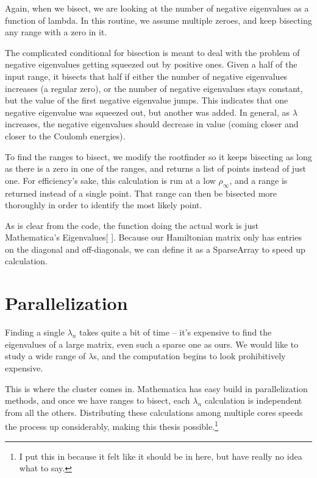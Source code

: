 \documentclass[12pt,twoside]{reedthesis}
\begin{document}
{Again, when we bisect, we are looking at the number of negative eigenvalues as a function of lambda. In this routine, we assume multiple zeroes, and keep bisecting any range with a zero in it.

The complicated conditional for bisection is meant to deal with the problem of negative eigenvalues getting squeezed out by positive ones. Given a half of the input range, it bisects that half if either the number of negative eigenvalues increases (a regular zero), or the number of negative eigenvalues stays constant, but the value of the first negative eigenvalue jumps. This indicates that one negative eigenvalue was squeezed out, but another was added. In general, as $\lambda$ increases, the negative eigenvalues should decrease in value (coming closer and closer to the Coulomb energies). 

To find the ranges to bisect, we modify the rootfinder so it keeps bisecting as long as there is a zero in one of the ranges, and returns a list of points instead of just one. For efficiency's sake, this calculation is run at a low $\rho_{\infty}$, and a range is returned instead of a single point. That range can then be bisected more thoroughly in order to identify the most likely point. 

As is clear from the code, the function doing the actual work is just Mathematica's Eigenvalues[ ]. Because our Hamiltonian matrix only has entries on the diagonal and off-diagonals, we can define it as a SparseArray to speed up calculation. 

\section{Parallelization}

Finding a single $\lambda_{n}$ takes quite a bit of time -- it's expensive to find the eigenvalues of a large matrix, even such a sparse one as ours. We would like to study a wide range of $\lambda$s, and the computation begins to look prohibitively expensive.

This is where the cluster comes in. Mathematica has easy build in parallelization methods, and once we have ranges to bisect, each $\lambda_{n}$ calculation is independent from all the others. Distributing these calculations among multiple cores speeds the process up considerably, making this thesis possible.\footnote{I put this in because it felt like it should be in here, but have really no idea what to say.}

%
%
%
\backmatter %
%

}
\end{document}
